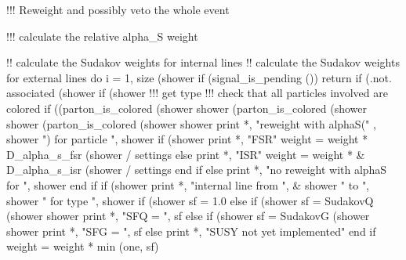     !!! Reweight and possibly veto the whole event

    !!! calculate the relative alpha_S weight

    !! calculate the Sudakov weights for internal lines
    !! calculate the Sudakov weights for external lines
    do i = 1, size (shower%
       if (signal_is_pending ()) return
       if (.not. associated (shower%
       if (shower%
          !!! get type
          !!! check that all particles involved are colored
          if ((parton_is_colored (shower%
               shower%
               (parton_is_colored (shower%
               shower%
               (parton_is_colored (shower%
               shower%
             print *, "reweight with alphaS(" , shower%
                  ") for particle ", shower%
             if (shower%
                print *, "FSR"
                weight = weight * D_alpha_s_fsr (shower%
                     / settings%
             else
                print *, "ISR"
                weight = weight * &
                     D_alpha_s_isr (shower%
                     / settings%
             end if
          else
             print *, "no reweight with alphaS for ", shower%
          end if
          if (shower%
             print *, "internal line from ", &
                  shower%
                  " to ", shower%
                  " for type ", shower%
             if (shower%
                sf = 1.0
             else if (shower%
                sf = SudakovQ (shower%
                     shower%
                print *, "SFQ = ", sf
             else if (shower%
                sf = SudakovG (shower%
                     shower%
                print *, "SFG = ", sf
             else
                print *, "SUSY not yet implemented"
             end if
             weight = weight * min (one, sf)

